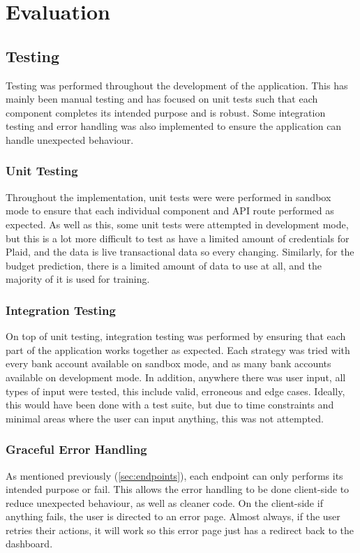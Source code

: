\chapter{Evaluation}
\label{ch:evaluation}

\section{Testing}
Testing was performed throughout the development of the application. This has mainly been manual testing and has focused on unit tests such that each component completes its intended purpose and is robust. Some integration testing and error handling was also implemented to ensure the application can handle unexpected behaviour.

\subsection{Unit Testing}
Throughout the implementation, unit tests were were performed in sandbox mode to ensure that each individual component and API route performed as expected. As well as this, some unit tests were attempted in development mode, but this is a lot more difficult to test as have a limited amount of credentials for Plaid, and the data is live transactional data so every changing. Similarly, for the budget prediction, there is a limited amount of data to use at all, and the majority of it is used for training.

\subsection{Integration Testing}
On top of unit testing, integration testing was performed by ensuring that each part of the application works together as expected. Each strategy was tried with every bank account available on sandbox mode, and as many bank accounts available on development mode. In addition, anywhere there was user input, all types of input were tested, this include valid, erroneous and edge cases. Ideally, this would have been done with a test suite, but due to time constraints and minimal areas where the user can input anything, this was not attempted.


\subsection{Graceful Error Handling}
As mentioned previously (\ref{sec:endpoints}), each endpoint can only performs its intended purpose or fail. This allows the error handling to be done client-side to reduce unexpected behaviour, as well as cleaner code. On the client-side if anything fails, the user is directed to an error page. Almost always, if the user retries their actions, it will work so this error page just has a redirect back to the dashboard.


